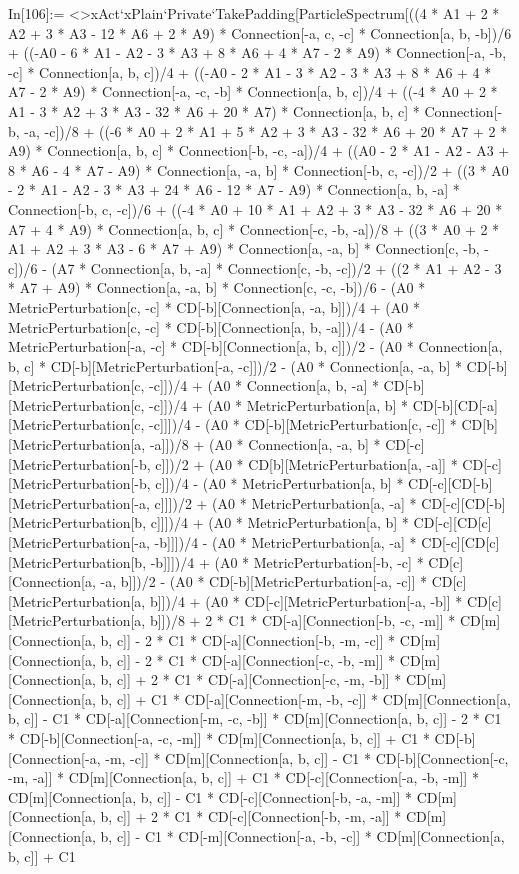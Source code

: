 In[106]:= <>xAct`xPlain`Private`TakePadding[ParticleSpectrum[((4 * A1 + 2 * A2 + 3 * A3 - 12 * A6 + 2 * A9) * Connection[-a, c, -c] * Connection[a, b, -b])/6 + ((-A0 - 6 * A1 - A2 - 3 * A3 + 8 * A6 + 4 * A7 - 2 * A9) * Connection[-a, -b, -c] * Connection[a, b, c])/4 + ((-A0 - 2 * A1 - 3 * A2 - 3 * A3 + 8 * A6 + 4 * A7 - 2 * A9) * Connection[-a, -c, -b] * Connection[a, b, c])/4 + ((-4 * A0 + 2 * A1 - 3 * A2 + 3 * A3 - 32 * A6 + 20 * A7) * Connection[a, b, c] * Connection[-b, -a, -c])/8 + ((-6 * A0 + 2 * A1 + 5 * A2 + 3 * A3 - 32 * A6 + 20 * A7 + 2 * A9) * Connection[a, b, c] * Connection[-b, -c, -a])/4 + ((A0 - 2 * A1 - A2 - A3 + 8 * A6 - 4 * A7 - A9) * Connection[a, -a, b] * Connection[-b, c, -c])/2 + ((3 * A0 - 2 * A1 - A2 - 3 * A3 + 24 * A6 - 12 * A7 - A9) * Connection[a, b, -a] * Connection[-b, c, -c])/6 + ((-4 * A0 + 10 * A1 + A2 + 3 * A3 - 32 * A6 + 20 * A7 + 4 * A9) * Connection[a, b, c] * Connection[-c, -b, -a])/8 + ((3 * A0 + 2 * A1 + A2 + 3 * A3 - 6 * A7 + A9) * Connection[a, -a, b] * Connection[c, -b, -c])/6 - (A7 * Connection[a, b, -a] * Connection[c, -b, -c])/2 + ((2 * A1 + A2 - 3 * A7 + A9) * Connection[a, -a, b] * Connection[c, -c, -b])/6 - (A0 * MetricPerturbation[c, -c] * CD[-b][Connection[a, -a, b]])/4 + (A0 * MetricPerturbation[c, -c] * CD[-b][Connection[a, b, -a]])/4 - (A0 * MetricPerturbation[-a, -c] * CD[-b][Connection[a, b, c]])/2 - (A0 * Connection[a, b, c] * CD[-b][MetricPerturbation[-a, -c]])/2 - (A0 * Connection[a, -a, b] * CD[-b][MetricPerturbation[c, -c]])/4 + (A0 * Connection[a, b, -a] * CD[-b][MetricPerturbation[c, -c]])/4 + (A0 * MetricPerturbation[a, b] * CD[-b][CD[-a][MetricPerturbation[c, -c]]])/4 - (A0 * CD[-b][MetricPerturbation[c, -c]] * CD[b][MetricPerturbation[a, -a]])/8 + (A0 * Connection[a, -a, b] * CD[-c][MetricPerturbation[-b, c]])/2 + (A0 * CD[b][MetricPerturbation[a, -a]] * CD[-c][MetricPerturbation[-b, c]])/4 - (A0 * MetricPerturbation[a, b] * CD[-c][CD[-b][MetricPerturbation[-a, c]]])/2 + (A0 * MetricPerturbation[a, -a] * CD[-c][CD[-b][MetricPerturbation[b, c]]])/4 + (A0 * MetricPerturbation[a, b] * CD[-c][CD[c][MetricPerturbation[-a, -b]]])/4 - (A0 * MetricPerturbation[a, -a] * CD[-c][CD[c][MetricPerturbation[b, -b]]])/4 + (A0 * MetricPerturbation[-b, -c] * CD[c][Connection[a, -a, b]])/2 - (A0 * CD[-b][MetricPerturbation[-a, -c]] * CD[c][MetricPerturbation[a, b]])/4 + (A0 * CD[-c][MetricPerturbation[-a, -b]] * CD[c][MetricPerturbation[a, b]])/8 + 2 * C1 * CD[-a][Connection[-b, -c, -m]] * CD[m][Connection[a, b, c]] - 2 * C1 * CD[-a][Connection[-b, -m, -c]] * CD[m][Connection[a, b, c]] - 2 * C1 * CD[-a][Connection[-c, -b, -m]] * CD[m][Connection[a, b, c]] + 2 * C1 * CD[-a][Connection[-c, -m, -b]] * CD[m][Connection[a, b, c]] + C1 * CD[-a][Connection[-m, -b, -c]] * CD[m][Connection[a, b, c]] - C1 * CD[-a][Connection[-m, -c, -b]] * CD[m][Connection[a, b, c]] - 2 * C1 * CD[-b][Connection[-a, -c, -m]] * CD[m][Connection[a, b, c]] + C1 * CD[-b][Connection[-a, -m, -c]] * CD[m][Connection[a, b, c]] - C1 * CD[-b][Connection[-c, -m, -a]] * CD[m][Connection[a, b, c]] + C1 * CD[-c][Connection[-a, -b, -m]] * CD[m][Connection[a, b, c]] - C1 * CD[-c][Connection[-b, -a, -m]] * CD[m][Connection[a, b, c]] + 2 * C1 * CD[-c][Connection[-b, -m, -a]] * CD[m][Connection[a, b, c]] - C1 * CD[-m][Connection[-a, -b, -c]] * CD[m][Connection[a, b, c]] + C1 